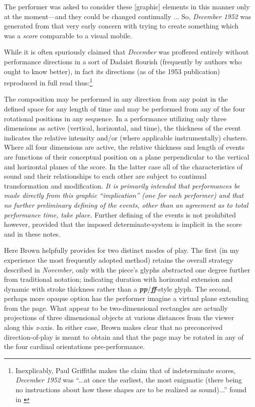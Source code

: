     \begin{smallquote}
         The performer was asked to consider these [graphic] elements in this manner only at the moment---and they could be changed continually ... So, \textit{December 1952} was generated from that very early concern with trying to create something which was a \textit{score} comparable to a visual mobile.\autocite{Brown_2008}
    \end{smallquote}

    While it is often spuriously claimed that \textit{December} was proffered entirely without performance directions in a sort of Dadaist flourish (frequently by authors who ought to know better), in fact its directions (as of the 1953 publication) reproduced in full read thus:\footnote{Inexplicably, Paul Griffiths makes the claim that of indeterminate scores, \textit{December 1952} was ``...at once the earliest, the most enigmatic (there being no instructions about how these shapes are to be realized as sound)...'' found in \autocite{Griffiths_2011}}

        \begin{smallquote}
            The composition may be performed in any direction from any point in the defined space for any length of time and may be performed from any of the four rotational positions in any sequence. In a performance utilizing only three dimensions as active (vertical, horizontal, and time), the thickness of the event indicates the relative intensity and/or (where applicable instrumentally) clusters. Where all four dimensions are active, the relative thickness and length of events are functions of their conceptual position on a plane perpendicular to the vertical and horizontal planes of the score. In the latter case all of the characteristics of sound and their relationships to each other are subject to continual transformation and modification. \textit{It is primarily intended that performances be made directly from this graphic ``implication'' (one for each performer) and that no further preliminary defining of the events, other than an agreement as to total performance time, take place.} Further defining of the events is not prohibited however, provided that the imposed determinate-system is implicit in the score and in these notes.\autocite[1]{Brown_1986}
        \end{smallquote}

    Here Brown helpfully provides for two distinct modes of play. The first (in my experience the most frequently adopted method) retains the overall strategy described in \textit{November}, only with the piece's glyphs abstracted one degree further from traditional notation; indicating duration with horizontal extension and dynamic with stroke thickness rather than a \textbf{\textit{pp}}/\textbf{\textit{ff}}-style glyph. The second, perhaps more opaque option has the performer imagine a virtual plane extending from the page. What appear to be two-dimensional rectangles are actually projections of three dimensional objects at various distances from the viewer along this \textit{z}-axis. In either case, Brown makes clear that no preconceived direction-of-play is meant to obtain and that the page may be rotated in any of the four cardinal orientations pre-performance. 
    
